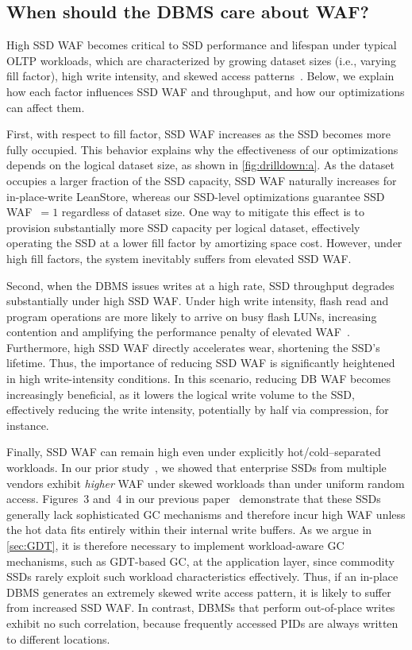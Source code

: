 \subsection{When should the DBMS care about WAF?}\label{sec:q2}
\noindent High SSD WAF becomes critical to SSD performance and lifespan under typical OLTP workloads, 
which are characterized by growing dataset sizes (i.e., varying fill factor), high write intensity, and skewed access patterns~\cite{ssdiq, DBLP:journals/pvldb/KangCOL20, Gray1993DebitCredit}.
Below, we explain how each factor influences SSD WAF and throughput, and how our optimizations can affect them.

First, with respect to fill factor, SSD WAF increases as the SSD becomes more fully occupied.
This behavior explains why the effectiveness of our optimizations depends on the logical dataset size, as shown in \cref{fig:drilldown:a}.
As the dataset occupies a larger fraction of the SSD capacity, SSD WAF naturally increases for in-place-write LeanStore, 
whereas our SSD-level optimizations guarantee SSD WAF~$=1$ regardless of dataset size.
One way to mitigate this effect is to provision substantially more SSD capacity per logical dataset, 
effectively operating the SSD at a lower fill factor by amortizing space cost.
However, under high fill factors, the system inevitably suffers from elevated SSD WAF.

Second, when the DBMS issues writes at a high rate, SSD throughput degrades substantially under high SSD WAF.
Under high write intensity, flash read and program operations are more likely to arrive on busy flash LUNs, 
increasing contention and amplifying the performance penalty of elevated WAF~\cite{lerner2024principles}.
Furthermore, high SSD WAF directly accelerates wear, shortening the SSD’s lifetime.
Thus, the importance of reducing SSD WAF is significantly heightened in high write-intensity conditions.
In this scenario, reducing DB WAF becomes increasingly beneficial, as it lowers the logical write volume to the SSD, 
effectively reducing the write intensity, potentially by half via compression, for instance.


Finally, SSD WAF can remain high even under explicitly hot/cold--separated workloads.
In our prior study~\cite{ssdiq}, we showed that enterprise SSDs from multiple vendors exhibit \emph{higher} WAF under skewed workloads than under uniform random access.
Figures~3 and~4 in our previous paper~\cite{ssdiq} demonstrate that these SSDs generally lack sophisticated GC mechanisms and therefore incur high WAF unless the hot data fits entirely within their internal write buffers.
As we argue in \cref{sec:GDT}, it is therefore necessary to implement workload-aware GC mechanisms, such as GDT-based GC, at the application layer, since commodity SSDs rarely exploit such workload characteristics effectively.
Thus, if an in-place DBMS generates an extremely skewed write access pattern, it is likely to suffer from increased SSD WAF.
In contrast, DBMSs that perform out-of-place writes exhibit no such correlation, because frequently accessed PIDs are always written to different locations.


